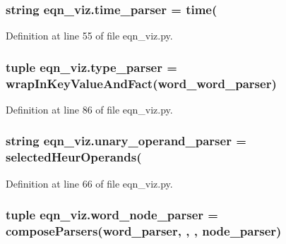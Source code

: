 \subsubsection[{time\+\_\+parser}]{\setlength{\rightskip}{0pt plus 5cm}string eqn\+\_\+viz.\+time\+\_\+parser = \textquotesingle{}time(\textquotesingle{}}\label{namespaceeqn__viz_a7bf2f0fb75b2d7a493e3ebf9cf2f580e}


Definition at line 55 of file eqn\+\_\+viz.\+py.

\hypertarget{namespaceeqn__viz_a80772625f40909e83c3baefb38694d27}{}
\subsubsection[{type\+\_\+parser}]{\setlength{\rightskip}{0pt plus 5cm}tuple eqn\+\_\+viz.\+type\+\_\+parser = {\bf wrap\+In\+Key\+Value\+And\+Fact}({\bf word\+\_\+word\+\_\+parser})}\label{namespaceeqn__viz_a80772625f40909e83c3baefb38694d27}


Definition at line 86 of file eqn\+\_\+viz.\+py.

\hypertarget{namespaceeqn__viz_a0eb89bf8984a1b19989d2031cae402a6}{}
\subsubsection[{unary\+\_\+operand\+\_\+parser}]{\setlength{\rightskip}{0pt plus 5cm}string eqn\+\_\+viz.\+unary\+\_\+operand\+\_\+parser = \textquotesingle{}selected\+Heur\+Operands(\textquotesingle{}}\label{namespaceeqn__viz_a0eb89bf8984a1b19989d2031cae402a6}


Definition at line 66 of file eqn\+\_\+viz.\+py.

\hypertarget{namespaceeqn__viz_ade698a80074d34a48d27d50b0b6faafc}{}
\subsubsection[{word\+\_\+node\+\_\+parser}]{\setlength{\rightskip}{0pt plus 5cm}tuple eqn\+\_\+viz.\+word\+\_\+node\+\_\+parser = {\bf compose\+Parsers}({\bf word\+\_\+parser}, \textquotesingle{},\textquotesingle{} , {\bf node\+\_\+parser})}\label{namespaceeqn__viz_ade698a80074d34a48d27d50b0b6faafc}


